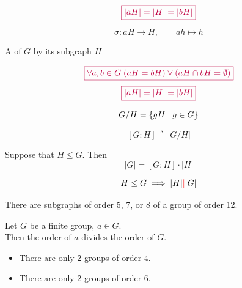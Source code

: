 \begin{frame}
  \[
    \textcolor{purple}{\boxed{|aH| = |H| = |bH|}}
  \]

  \vspace{0.30cm}
  \pause
  \[
    \sigma: aH \to H, \qquad ah \mapsto h
  \]
\end{frame}

\begin{frame}
  \begin{center}
    A   of $G$ by its subgraph $H$
  \end{center}


  \[
    \textcolor{purple}{\boxed{\forall a, b \in G\; (aH = bH)
      \lor (aH \cap bH = \emptyset)}}
  \]
  \[
    \textcolor{purple}{\boxed{|aH| = |H| = |bH|}}
  \]
\end{frame}

\begin{frame}
  \begin{definition}
    \[
      G/H = \{gH \mid g \in G\}
    \]

    \[
      [G : H] \triangleq |G/H|
    \]
  \end{definition}

  \pause
  \vspace{0.50cm}
  \begin{theorem}
    Suppose that $H \le G$. Then
    \[
      |G| = [G : H] \cdot |H|
    \]
  \end{theorem}
\end{frame}

\begin{frame}
  \begin{theorem}
    \[
      H \le G \implies |H| \textcolor{red}{\mid} |G|
    \]
  \end{theorem}

  \pause
  \vspace{0.50cm}
  \begin{center}
    There are  subgraphs of order 5, 7, or 8 of a group of order 12.
  \end{center}

  \pause
  \begin{theorem}
    Let $G$ be a finite group, $a \in G$. \\[3pt]
    Then the order of $a$ divides the order of $G$.
  \end{theorem}

  \pause
  \vspace{0.50cm}
  \begin{theorem}
    \begin{itemize}
      \item There are only 2 groups of order 4.
      \item There are only 2 groups of order 6.
    \end{itemize}
  \end{theorem}
\end{frame}
